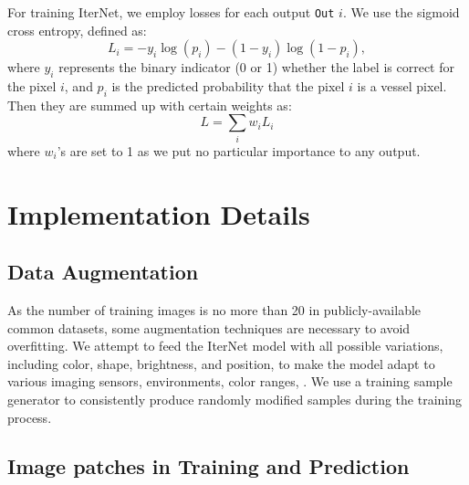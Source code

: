 \documentclass[10pt,twocolumn,letterpaper]{article}
\begin{document}
For training IterNet, we employ losses for each output \texttt{Out} $i$. We use the sigmoid cross entropy, defined as:
\begin{equation}
    L_i = -y_i \log(p_i) - (1-y_i)\log(1-p_i),
\end{equation}
where $y_i$ represents the binary indicator (0 or 1) whether the label is correct for the pixel $i$, and $p_i$ is the predicted probability that the pixel $i$ is a vessel pixel. Then they are summed up with certain weights as:
\begin{equation}
    L = \sum_i w_i L_i
\end{equation}
where $w_i$'s are set to 1 as we put no particular importance to any output.

\section{Implementation Details} \label{section_details}

\subsection{Data Augmentation} 

As the number of training images is no more than 20 in publicly-available common datasets, some augmentation techniques are necessary to avoid overfitting. We attempt to feed the IterNet model with all possible variations, including color, shape, brightness, and position, to make the model adapt to various imaging sensors, environments, color ranges, \etc. We use a training sample generator to consistently produce randomly modified samples during the training process. 

\subsection{Image patches in Training and Prediction}
\end{document}
